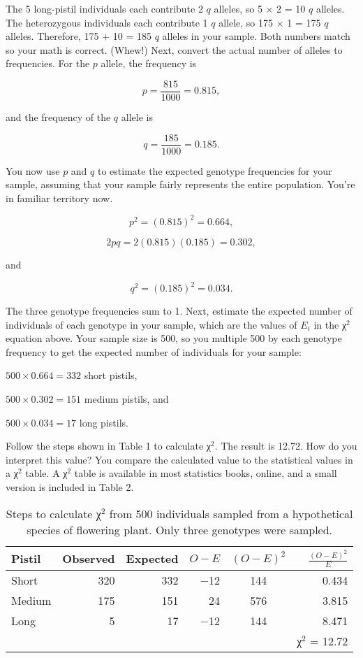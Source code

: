 \documentclass[12pt]{exam}
\begin{document}
\begin{questions}
The 5 long-pistil individuals each contribute 2 $q$ alleles, so 5 $\times$ 2 = 10 $q$ alleles. The heterozygous individuals each contribute 1 $q$ allele, so 175 $\times$ 1 = 175 $q$ alleles. Therefore, 175 $+$ 10 = 185 $q$ alleles in your sample. Both numbers match so your math is correct. (Whew!) Next, convert the actual number of alleles to frequencies. For the $p$ allele, the frequency is 

 \[p = \frac{815}{1000} = 0.815,\]

\noindent and the frequency of the $q$ allele is

 \[q = \frac{185}{1000} = 0.185.\]

You now use $p$ and $q$ to estimate the expected genotype frequencies for your sample, assuming that your sample fairly represents the entire population. You’re in familiar territory now.

\[p^2 = (0.815)^2 = 0.664,\]

\[2pq = 2(0.815)(0.185) = 0.302,\]

and

\[q^2 = (0.185)^2 = 0.034.\]

The three genotype frequencies sum to 1. Next, estimate the expected number of individuals of each genotype in your sample, which are the values of $E_i$ in the χ$^2$ equation above. Your sample size is 500, so you multiple 500 by each genotype frequency to get the expected number of individuals for your sample:\vspace{\baselineskip}

$500 \times 0.664 = 332$ short pistils,

$500 \times 0.302 = 151$ medium pistils, and

$500 \times 0.034 = 17$ long pistils.\vspace{\baselineskip}

Follow the steps shown in Table 1 to calculate χ$^2$. The result is 12.72. How do you interpret this value? You compare the calculated value to the statistical values in a χ$^2$ table. A χ$^2$ table is available in most statistics books, online, and a small version is included in Table 2.

\begin{table}[h!]
\begin{center}
\caption{Steps to calculate χ$^2$ from 500 individuals sampled from a hypothetical species of flowering plant. Only three genotypes were sampled.}
\begin{tabular}{lrrrcr}
\toprule
Pistil	&	Observed	&	Expected	&	$O-E	$	&	$(O-E)^2$	&	$\frac{(O-E)^2}{E}$ \\
\midrule
Short	&	320	&	332	&	$-$12	&	144	&	0.434 \\
Medium	&	175	&	151	&	24	&	576	&	3.815 \\
Long		&	5	&	17	&	$-$12	&	144	&	8.471 \\
 		&		&		&			&		&	χ$^2$ = 12.72\\
\bottomrule
\end{tabular}
\end{center}
\end{table}


\end{questions}
\end{document}
